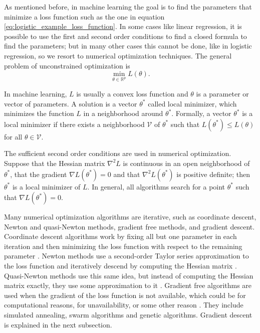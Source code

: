 As mentioned before, in machine learning the goal is to find the parameters that minimize a loss function such as the one in equation \eqref{eq:logistic_example_loss_function}. In some cases like linear regression, it is possible to use the first and second order conditions to find a closed formula to find the parameters; but in many other cases this cannot be done, like in logistic regression, so we resort to numerical optimization techniques. The general problem of unconstrained optimization \cite{nocedal2006numerical} is
\begin{equation}
  \min_{\theta \in \mathbb{R}^p} L(\theta).
\end{equation}

In machine learning, $L$ is usually a convex loss function and $\theta$ is a parameter or vector of parameters. A solution is a vector $\theta^*$ called local minimizer, which minimizes the function $L$ in a neighborhood around $\theta^*$. Formally, a vector $\theta^*$ is a local minimizer if there exists a neighborhood $\mathcal{V}$ of $\theta^*$ such that $L(\theta^*) \leq L(\theta)$ for all $\theta \in \mathcal{V}$.

The sufficient second order conditions are used in numerical optimization. Suppose that the Hessian matrix $\nabla^2 L$ is continuous in an open neighborhood of $\theta^*$, that the gradient $\nabla L(\theta^*) = 0$ and that $\nabla^2 L(\theta^*)$ is positive definite; then $\theta^*$ is a local minimizer of $L$. In general, all algorithms search for a point $\theta^*$ such that $\nabla L(\theta^*) = 0$.

Many numerical optimization algorithms are iterative, such as coordinate descent, Newton and quasi-Newton methods, gradient free methods, and gradient descent. Coordinate descent algorithms work by fixing all but one parameter in each iteration and then minimizing the loss function with respect to the remaining parameter \cite{friedman2007pathwise} \cite{wright2015coordinate}.
Newton methods use a second-order Taylor series approximation to the loss function and iteratively descend by computing the Hessian matrix \cite[p.~22]{nocedal2006numerical}. Quasi-Newton methods use this same idea, but instead of computing the Hessian matrix exactly, they use some approximation to it \cite{byrd1995limited} \cite[p.~23]{nocedal2006numerical}.
Gradient free algorithms are used when the gradient of the loss function is not available, which could be for computational reasons, for unavailability, or some other reason \cite{rios2013derivative}. They include simulated annealing, swarm algorithms and genetic algorithms.
Gradient descent is explained in the next subsection.

